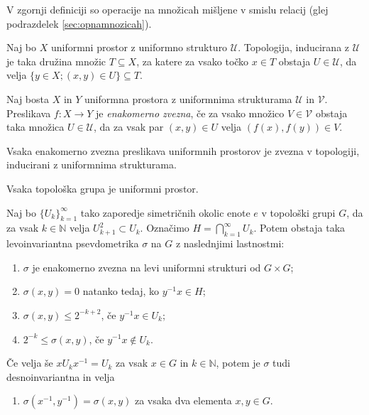 \documentclass[mat1]{fmfdelo}
\newcommand{\N}{\mathbb N}
\begin{document}
\begin{opomba}
V zgornji definiciji so operacije na množicah mišljene v smislu relacij (glej podrazdelek \ref{sec:opnamnozicah}).
\end{opomba}

\begin{definicija}\label{def:uniinduciranatopo}
Naj bo $X$ uniformni prostor z uniformno strukturo $\mathcal{U}$. Topologija, inducirana z $\mathcal{U}$ je taka družina množic $T \subseteq X$, za katere za vsako točko $x \in T$ obstaja $U \in \mathcal{U}$, da velja $\lbrace y \in X ; (x, y) \in U \rbrace \subseteq T$.
\end{definicija}

\begin{definicija}\label{def:enakzveznost}
Naj bosta $X$ in $Y$ uniformna prostora z uniformnima strukturama $\mathcal{U}$ in $\mathcal{V}$. Preslikava $f: X \to Y$ je \emph{enakomerno zvezna}, če za vsako množico $V \in \mathcal{V}$ obstaja taka množica $U \in \mathcal{U}$, da za vsak par $(x, y) \in U$ velja $(f(x), f(y)) \in V$.
\end{definicija}

\begin{trditev}\label{trd:enakzveznazvezna}
Vsaka enakomerno zvezna preslikava uniformnih prostorov je zvezna v topologiji, inducirani z uniformnima strukturama.
\end{trditev}

\begin{trditev}\label{trd:topguniform}
Vsaka topološka grupa je uniformni prostor.
\end{trditev}

\begin{izrek}\label{izr:pseudometrika}
	Naj bo $\lbrace U_k \rbrace_{k = 1}^{\infty}$ tako zaporedje simetričnih okolic enote $e$ v topološki grupi $G$, da za vsak $k \in \N$ velja $U_{k+1}^2 \subset U_k$. Označimo $H = \bigcap_{k=1}^{\infty} U_k$. Potem obstaja taka levoinvariantna psevdometrika $\sigma$ na $G$ z naslednjimi lastnostmi:
	\begin{enumerate}
		\item $\sigma$ je enakomerno zvezna na levi uniformni strukturi od $G \times G$;
		\item $\sigma (x, y) = 0$ natanko tedaj, ko $y^{-1}x \in H$;
		\item $\sigma (x, y) \leq 2^{-k+2}$, če $y^{-1}x \in U_k$;
		\item $2^{-k} \leq \sigma (x, y)$, če $y^{-1}x \notin U_k$.
	\end{enumerate}
	
	Če velja še $x U_k x^{-1} = U_k$ za vsak $x \in G$ in $k \in \N$, potem je $\sigma$ tudi desnoinvariantna in velja
	\begin{enumerate}[resume]
		\item $\sigma (x^{-1}, y^{-1}) = \sigma (x, y)$ za vsaka dva elementa $x, y \in G$.
	\end{enumerate}
\end{izrek}
\end{document}
